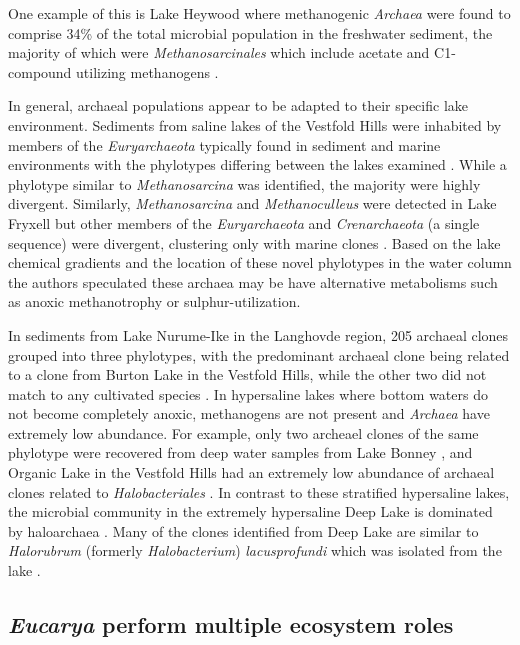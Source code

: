 One example of this is Lake Heywood where methanogenic \emph{Archaea} were found to comprise 34\% of the total microbial population in the freshwater sediment, 
the majority of which were \emph{Methanosarcinales} which include acetate and C1-compound utilizing methanogens \cite{Purdy2003}. 

In general, archaeal populations appear to be adapted to their specific lake environment.
Sediments from saline lakes of the Vestfold Hills were inhabited by members of the \emph{Euryarchaeota} typically found in sediment and marine environments 
with the phylotypes differing between the lakes examined \cite{Bowman2000a}. 
While a phylotype similar to \emph{Methanosarcina} was identified, the majority were highly divergent. 
Similarly, \emph{Methanosarcina} and \emph{Methanoculleus} were detected in Lake Fryxell but other members of the \emph{Euryarchaeota} and \emph{Crenarchaeota} (a single sequence) were divergent, 
clustering only with marine clones \cite{Karr2006}. 
Based on the lake chemical gradients and the location of these novel phylotypes in the water column the authors speculated these archaea may be have alternative metabolisms such as anoxic methanotrophy or sulphur-utilization. 

In sediments from Lake Nurume-Ike in the Langhovde region, 205 archaeal clones grouped into three phylotypes, 
with the predominant archaeal clone being related to a clone from Burton Lake in the Vestfold Hills, while the other two did not match to any cultivated species \cite{Kurosawa2010}. 
In hypersaline lakes where bottom waters do not become completely anoxic, methanogens are not present and \emph{Archaea} have extremely low abundance. 
For example, only two archeael clones of the same phylotype were recovered from deep water samples from Lake Bonney \cite{Glatz2006}, 
and Organic Lake in the Vestfold Hills had an extremely low abundance of archaeal clones related to \emph{Halobacteriales} \cite{Bowman2000b}. 
In contrast to these stratified hypersaline lakes, the microbial community in the extremely hypersaline Deep Lake is dominated by haloarchaea \cite{Bowman2000b}. 
Many of the clones identified from Deep Lake are similar to \emph{Halorubrum} (formerly \emph{Halobacterium}) \emph{lacusprofundi} which was isolated from the lake \cite{Franzmann1988}. 


\subsection{\emph{Eucarya} perform multiple ecosystem roles}

